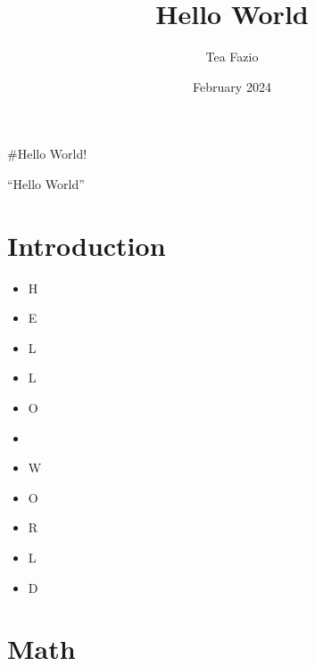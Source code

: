\documentclass{article}
\title{Hello World}
\author{Tea Fazio}
\date{February 2024}
\begin{document}
\maketitle

\#Hello World! %

``Hello World'' %

\section{Introduction}
    \begin{itemize}
        \item H
        \item E
        \item L
        \item L
        \item O
        \item 
        \item W
        \item O
        \item R
        \item L
        \item D
    \end{itemize}

\section{Math}
\end{document}
